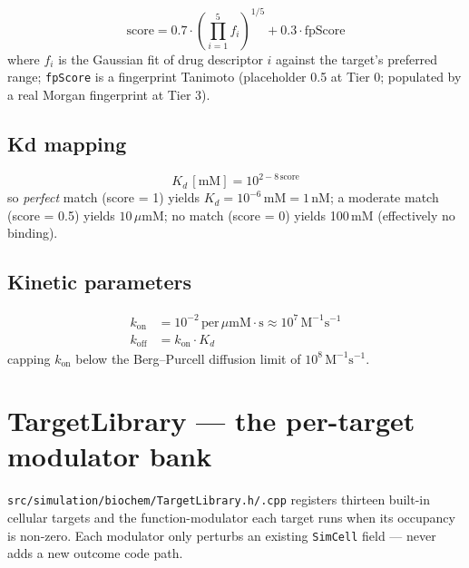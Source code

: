 \documentclass[11pt,letterpaper,twoside,openany]{book}
\newcommand{\code}[1]{\texttt{#1}}
\newcommand{\file}[1]{\texttt{\small#1}}
\newcommand{\um}{\ensuremath{\mu\text{m}}}
\begin{document}
\begin{equation}
  \text{score} = 0.7 \cdot \left(\prod_{i=1}^5 f_i\right)^{1/5} + 0.3 \cdot \text{fpScore}
\end{equation}
where $f_i$ is the Gaussian fit of drug descriptor $i$ against the
target's preferred range; \texttt{fpScore} is a fingerprint Tanimoto
(placeholder 0.5 at Tier 0; populated by a real Morgan fingerprint
at Tier 3).

\section{Kd mapping}

\begin{equation}
  K_d\,[\text{mM}] = 10^{2 - 8\,\text{score}}
\end{equation}
so \emph{perfect} match (score = 1) yields $K_d = 10^{-6}\,\text{mM}
= 1\,\text{nM}$; a moderate match (score = 0.5) yields
$10\,\um\text{M}$; no match (score = 0) yields 100\,mM (effectively
no binding).

\section{Kinetic parameters}

\begin{align*}
  k_\text{on} &= 10^{-2}\,\text{per}\,\um\text{M}\cdot\text{s} \approx 10^7\,\text{M}^{-1}\text{s}^{-1}\\
  k_\text{off} &= k_\text{on} \cdot K_d
\end{align*}
capping \(k_\text{on}\) below the Berg--Purcell diffusion limit of
$10^8\,\text{M}^{-1}\text{s}^{-1}$.

\chapter{TargetLibrary --- the per-target modulator bank}
\label{ch:targetlib}

\file{src/simulation/biochem/TargetLibrary.h/.cpp} registers thirteen
built-in cellular targets and the function-modulator each target
runs when its occupancy is non-zero. Each modulator only
perturbs an existing \code{SimCell} field --- never adds a new
outcome code path.
\end{document}
